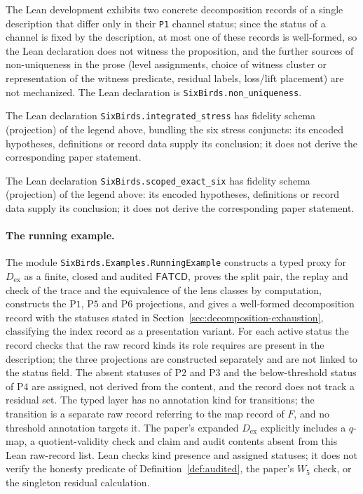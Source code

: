 \documentclass[11pt]{article}
\theoremstyle{definition}
\newcommand{\FATCD}{\ensuremath{\mathsf{FATCD}}}
\newcommand{\Pone}{\ensuremath{\mathrm{P1}}}
\newcommand{\Ptwo}{\ensuremath{\mathrm{P2}}}
\newcommand{\Pthree}{\ensuremath{\mathrm{P3}}}
\newcommand{\Pfour}{\ensuremath{\mathrm{P4}}}
\newcommand{\Pfive}{\ensuremath{\mathrm{P5}}}
\newcommand{\Psix}{\ensuremath{\mathrm{P6}}}
\begin{document}
\begin{description}[style=unboxed,leftmargin=0pt,itemsep=3pt]
  \item[Proposition~\ref{prop:non-uniqueness}.] The Lean development exhibits two concrete decomposition records of a single description that differ only in their \texttt{P1} channel status; since the status of a channel is fixed by the description, at most one of these records is well-formed, so the Lean declaration does not witness the proposition, and the further sources of non-uniqueness in the prose (level assignments, choice of witness cluster or representation of the witness predicate, residual labels, loss/lift placement) are not mechanized. The Lean declaration is \texttt{SixBirds.non\_uniqueness}.
  \item[Proposition~\ref{thm:integrated-stress}.] The Lean declaration \texttt{SixBirds.integrated\_stress} has fidelity schema (projection) of the legend above, bundling the six stress conjuncts: its encoded hypotheses, definitions or record data supply its conclusion; it does not derive the corresponding paper statement.
  \item[Theorem~\ref{thm:scoped-exact-six}.] The Lean declaration \texttt{SixBirds.scoped\_exact\_six} has fidelity schema (projection) of the legend above: its encoded hypotheses, definitions or record data supply its conclusion; it does not derive the corresponding paper statement.
\end{description}

\paragraph{The running example.} The module \texttt{SixBirds.Examples.RunningExample}
constructs a typed proxy for \(D_{\mathrm{ex}}\) as a finite, closed and audited
\FATCD{}, proves the split pair, the replay and check of the trace and the
equivalence of the lens classes by computation, constructs the \Pone{}, \Pfive{}
and \Psix{} projections, and gives a well-formed decomposition record with the
statuses stated in Section~\ref{sec:decomposition-exhaustion}, classifying the
index record as a presentation variant. For each active status the record
checks that the raw record kinds its role requires are present in the
description; the three projections are constructed separately and are not
linked to the status field. The absent statuses of \Ptwo{} and \Pthree{} and the
below-threshold status of \Pfour{} are assigned, not derived from the content,
and the record does not track a residual set. The typed layer has no
annotation kind for transitions; the transition is a separate raw record
referring to the map record of \(F\), and no threshold annotation targets it. The paper's expanded \(D_{\mathrm{ex}}\) explicitly includes a \(q\)-map, a
quotient-validity check and claim and audit contents absent from this Lean
raw-record list. Lean checks kind presence and assigned statuses; it does not
verify the honesty predicate of Definition~\ref{def:audited}, the paper's \(W_5\) check, or the
singleton residual calculation.
\end{document}
